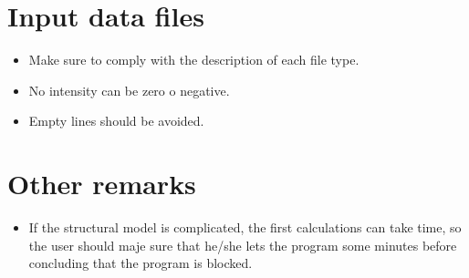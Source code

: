 \section{Input data files}

\begin{itemize}

	\item Make sure to comply with the description of each file type.

	\item No intensity can be zero o negative.

	\item Empty lines should be avoided.

\end{itemize}

\section{Other remarks}

\begin{itemize}

	\item If the structural model is complicated, the first calculations can take time, so the user should maje sure that he/she lets the program some minutes before concluding that the program is blocked. 

\end{itemize}






